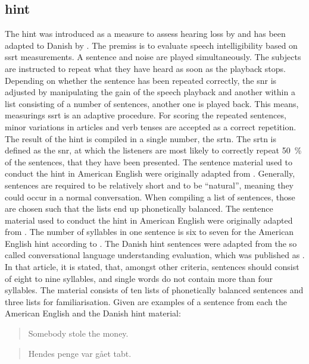 \subsection{\gls{hint}}\label{ssec:hint}
The \gls{hint} was introduced as a measure to assess hearing loss by \citep{nilsson_95} and has been adapted to Danish by \citep{hint_2011}.
The premiss is to evaluate speech intelligibility based on \gls{ssrt} measurements. 
A sentence and noise are played simultaneously. The subjects are instructed to repeat what they have heard as soon as the playback stops. 
Depending on whether the sentence has been repeated correctly, the \gls{snr} is adjusted by manipulating the gain of the speech playback and another within a list consisting of a number of sentences, another one is played back. This means, measurings \gls{ssrt} is an adaptive procedure.
For scoring the repeated sentences, minor variations in articles and verb tenses are accepted as a correct repetition.
The result of the \gls{hint} is compiled in a single number, the \gls{srtn}.
The \gls{srtn} is defined as the \gls{snr}, at which the listeners are most likely to correctly repeat \SI{50}{\percent} of the sentences, that they have been presented.
The sentence material used to conduct the \gls{hint} in American English were originally adapted from \citep{bench_bamford_79}. 
Generally, sentences are required to be relatively short and to be \enquote{natural}, meaning they could occur in a normal conversation.
When compiling a list of sentences, those are chosen such that the lists end up phonetically balanced. 
The sentence material used to conduct the \gls{hint} in American English were originally adapted from \citep{bench_bamford_79}.
The number of syllables in one sentence is six to seven for the American English \gls{hint} according to \citep{nilsson_95}.
The Danish \gls{hint} sentences were adapted from the so called conversational language understanding evaluation, which was published as \citep{nielsen_dau_09}. In that article, it is stated, that, amongst other criteria, sentences should consist of eight to nine syllables, and single words do not contain more than four syllables.
The material consists of ten lists of phonetically balanced sentences and three lists for familiarisation.
Given are examples of a sentence from each the American English and the Danish \gls{hint} material:
\begin{quote}
Somebody stole the money.
\end{quote}
\begin{quote}
Hendes penge var gået tabt.
\end{quote}
